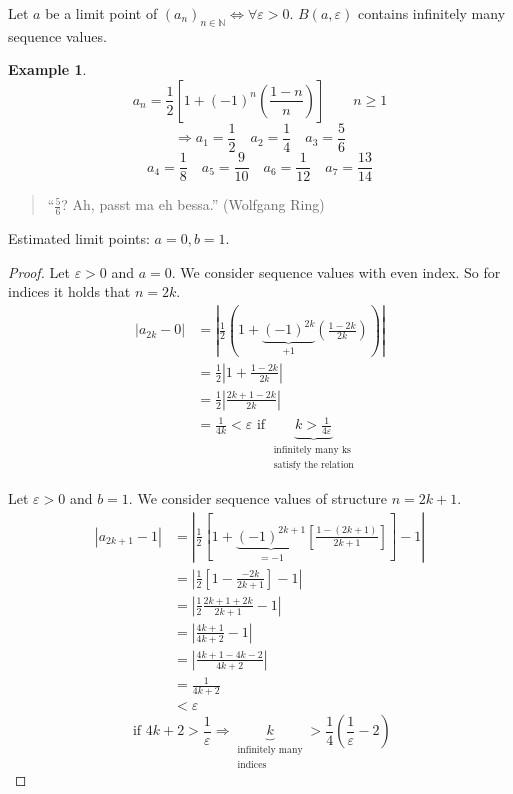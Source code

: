\documentclass[a4paper,landscape,twocolumn]{article}
\theoremstyle{definition}
\newtheorem{ex}{Example}
\newcommand\abs[1]{\left|#1\right|}
\newcommand\seq[1]{{\left(#1\right)}_{n \in \mathbb N}}
\begin{document}
Let $a$ be a limit point of $\seq{a_n} \Leftrightarrow \forall \varepsilon > 0$.
$B(a, \varepsilon)$ contains infinitely many sequence values.

\begin{ex}
  \[ a_n = \frac12 \left[1 + (-1)^n \left(\frac{1-n}{n}\right)\right] \qquad n \geq 1 \]
  \[ \Rightarrow a_1 = \frac12 \quad a_2 = \frac14 \quad a_3 = \frac56 \]
  \[ a_4 = \frac18 \quad a_5 = \frac{9}{10} \quad a_6 = \frac{1}{12} \quad a_7 = \frac{13}{14} \]
  \begin{quote}
    \foreignlanguage{ngerman}{\enquote{$\frac56$? Ah, passt ma eh bessa.} (Wolfgang Ring)}
  \end{quote}

  Estimated limit points: $a = 0, b = 1$.

  \begin{proof}
    Let $\varepsilon > 0$ and $a = 0$. We consider sequence values with even index.
    So for indices it holds that $n = 2k$.
    \begin{align*}
      \abs{a_{2k} - 0}
        &= \abs{\frac12(1 + \underbrace{(-1)^{2k}}_{+1} \left(\frac{1-2k}{2k}\right))} \\
        &= \frac12 \abs{1 + \frac{1-2k}{2k}} \\
        &= \frac12 \abs{\frac{2k + 1 - 2k}{2k}} \\
        &= \frac1{4k} < \varepsilon \text{ if } \underbrace{k > \frac{1}{4\varepsilon}}_{\substack{\text{infinitely many ks} \\ \text{satisfy the relation}}}
    \end{align*}

    Let $\varepsilon > 0$ and $b = 1$. We consider sequence values of structure $n = 2k+1$.
    \begin{align*}
      \abs{a_{2k+1} - 1}
        &= \abs{\frac12 \left[1 + \underbrace{(-1)^{2k+1}}_{=-1} \left[\frac{1 - (2k+1)}{2k+1}\right]\right] - 1} \\
        &= \abs{\frac12 \left[1 - \frac{-2k}{2k+1}\right] - 1} \\
        &= \abs{\frac12 \frac{2k+1+2k}{2k+1} - 1} \\
        &= \abs{\frac{4k+1}{4k+2} - 1} \\
        &= \abs{\frac{4k+1 - 4k-2}{4k+2}} \\
        &= \frac{1}{4k+2} \\
        &< \varepsilon
    \end{align*}
    \[ \text{ if } 4k+2 > \frac1\varepsilon \Rightarrow \underbrace{k}_{\substack{\text{infinitely many} \\ \text{indices}}} > \frac14 \left(\frac1\varepsilon - 2\right) \]
  \end{proof}
\end{ex}
\end{document}

